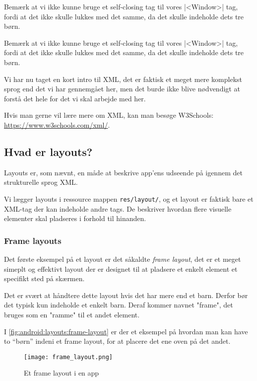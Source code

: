 \begin{remark}
	Bemærk at vi ikke kunne bruge et self-closing tag til vores \XmlInline|<Window>| tag, fordi at det ikke skulle lukkes med det samme, da det skulle indeholde dets tre børn.
\end{remark}

Bemærk at vi ikke kunne bruge et self-closing tag til vores \XmlInline|<Window>| tag, fordi at det ikke skulle lukkes med det samme, da det skulle indeholde dets tre børn.

Vi har nu taget en kort intro til XML, det er faktisk et meget mere komplekst sprog end det vi har gennemgået her, men det burde ikke blive nødvendigt at forstå det hele for det vi skal arbejde med her.

Hvis man gerne vil lære mere om XML, kan man besøge W3Schools: \url{https://www.w3schools.com/xml/}.


\subsection{Hvad er layouts?}
Layouts er, som nævnt, en måde at beskrive app'ens udseende på igennem det strukturelle sprog XML.

Vi lægger layouts i ressource mappen \texttt{res/layout/}, og et layout er faktisk bare et XML-tag der kan indeholde andre tags. De beskriver hvordan flere visuelle elementer skal pladseres i forhold til hinanden.

\subsubsection{Frame layouts}

Det første eksempel på et layout er det såkaldte \textit{frame layout}, det er et meget simeplt og effektivt layout der er designet til at pladsere et enkelt element et specifikt sted på skærmen.

Det er svært at håndtere dette layout hvis det har mere end et barn. Derfor bør det typisk kun indeholde et enkelt barn. Deraf kommer navnet "frame", det bruges som en "ramme" til et andet element.

I \autoref{fig:android:layouts:frame-layout} er der et eksempel på hvordan man 
kan have to ``børn'' indeni et frame layout, for at placere det ene oven på det 
andet.

\begin{figure}[h]
	\begin{center}
		\texttt{[image: frame\_layout.png]}
		\caption{Et frame layout i en app}
		\label{fig:android:layouts:frame-layout}
	\end{center}
\end{figure}

